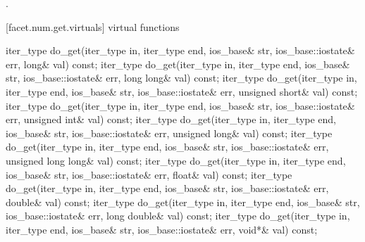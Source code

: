 \begin{itemdescr}
\pnum
\returns
{}.
\end{itemdescr}

[facet.num.get.virtuals]{ virtual functions}

%
%
\begin{itemdecl}
iter_type do_get(iter_type in, iter_type end, ios_base& str,
  ios_base::iostate& err, long& val) const;
iter_type do_get(iter_type in, iter_type end, ios_base& str,
  ios_base::iostate& err, long long& val) const;
iter_type do_get(iter_type in, iter_type end, ios_base& str,
  ios_base::iostate& err, unsigned short& val) const;
iter_type do_get(iter_type in, iter_type end, ios_base& str,
  ios_base::iostate& err, unsigned int& val) const;
iter_type do_get(iter_type in, iter_type end, ios_base& str,
  ios_base::iostate& err, unsigned long& val) const;
iter_type do_get(iter_type in, iter_type end, ios_base& str,
  ios_base::iostate& err, unsigned long long& val) const;
iter_type do_get(iter_type in, iter_type end, ios_base& str,
  ios_base::iostate& err, float& val) const;
iter_type do_get(iter_type in, iter_type end, ios_base& str,
  ios_base::iostate& err, double& val) const;
iter_type do_get(iter_type in, iter_type end, ios_base& str,
  ios_base::iostate& err, long double& val) const;
iter_type do_get(iter_type in, iter_type end, ios_base& str,
  ios_base::iostate& err, void*& val) const;
\end{itemdecl}

